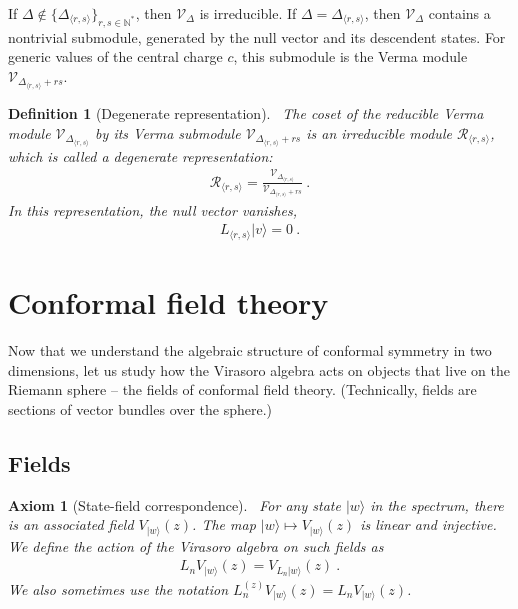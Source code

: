 \documentclass[12pt, a4paper]{article}
\theoremstyle{break}
\newtheorem{hyp}[exo]{Axiom}
\newtheorem{defn}[exo]{Definition}
\begin{document}
If $\Delta\notin\{\Delta_{\langle r,s\rangle}\}_{r,s\in\mathbb{N}^*}$, then $\mathcal V_\Delta$ is irreducible. If $\Delta = \Delta_{\langle r,s\rangle}$, then $\mathcal V_\Delta$ contains a nontrivial submodule, generated by the null vector and its descendent states. For generic values of the central charge $c$, this submodule is the Verma module $\mathcal V_{\Delta_{\langle r,s\rangle}+rs}$.

\begin{defn}[Degenerate representation]
 ~\label{def:deg}
The coset of the reducible Verma module $\mathcal V_{\Delta_{\langle r,s\rangle}}$ by its Verma submodule $\mathcal V_{\Delta_{\langle r,s\rangle}+rs}$ is an irreducible module $\mathcal{R}_{\langle r,s\rangle}$, which is called a degenerate representation:
\begin{align}
 \mathcal{R}_{\langle r,s\rangle} = \frac{\mathcal V_{\Delta_{\langle r,s\rangle}}}{\mathcal V_{\Delta_{\langle r,s\rangle}+rs}}\ .
\end{align}
In this representation, the null vector vanishes,
\begin{align}
 L_{\langle r,s\rangle}|v\rangle = 0\ .
\end{align}
\end{defn}


\section{Conformal field theory}\label{sec:cft}

Now that we understand the algebraic structure of conformal symmetry in two dimensions, let us study how the Virasoro algebra acts on objects that live on the Riemann sphere -- the fields of conformal field theory. (Technically, fields are sections of vector bundles over the sphere.)

\subsection{Fields}

\begin{hyp}[State-field correspondence]
 ~\label{hyp:sfc}
For any state $|w\rangle$ in the spectrum, there is an associated field $V_{|w\rangle}(z)$. The map $|w\rangle \mapsto V_{|w\rangle}(z)$ is linear and injective. We define the action of the Virasoro algebra on such fields as 
\begin{align}
 L_n V_{|w\rangle}(z) =   V_{L_n|w\rangle}(z)\ .
\end{align}
We also sometimes use the notation $L_n^{(z)} V_{|w\rangle}(z)=L_n V_{|w\rangle}(z)$. 
\end{hyp}
\end{document}

